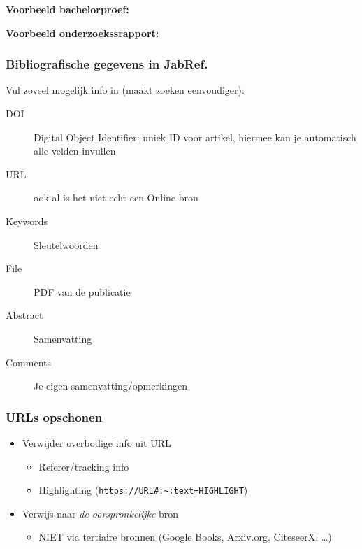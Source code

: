\documentclass[aspectratio=169]{beamer}
\begin{document}
\begin{frame}[plain]

  \textbf{Voorbeeld bachelorproef:}


  \medskip

  \textbf{Voorbeeld onderzoekssrapport:}


\end{frame}

\begin{frame}
  \frametitle{Bibliografische gegevens in JabRef.}

  Vul zoveel mogelijk info in (maakt zoeken eenvoudiger):

  \begin{description}
    \item[DOI] Digital Object Identifier: uniek ID voor artikel, hiermee kan je automatisch alle velden invullen
    \item[URL] ook al is het niet echt een Online bron
    \item[Keywords] Sleutelwoorden
    \item[File] PDF van de publicatie
    \item[Abstract] Samenvatting
    \item[Comments] Je eigen samenvatting/opmerkingen
  \end{description}

\end{frame}

\begin{frame}[fragile]
  \frametitle{URLs opschonen}

  \begin{itemize}
    \item Verwijder overbodige info uit URL
      \begin{itemize}
        \item Referer/tracking info
        \item Highlighting (\verb+https://URL#:~:text=HIGHLIGHT+)
      \end{itemize}
    \item Verwijs naar \textit{de oorspronkelijke} bron
      \begin{itemize}
        \item NIET via tertiaire bronnen (Google Books, Arxiv.org, CiteseerX, \ldots)
      \end{itemize}
  \end{itemize}

\end{frame}
\end{document}
